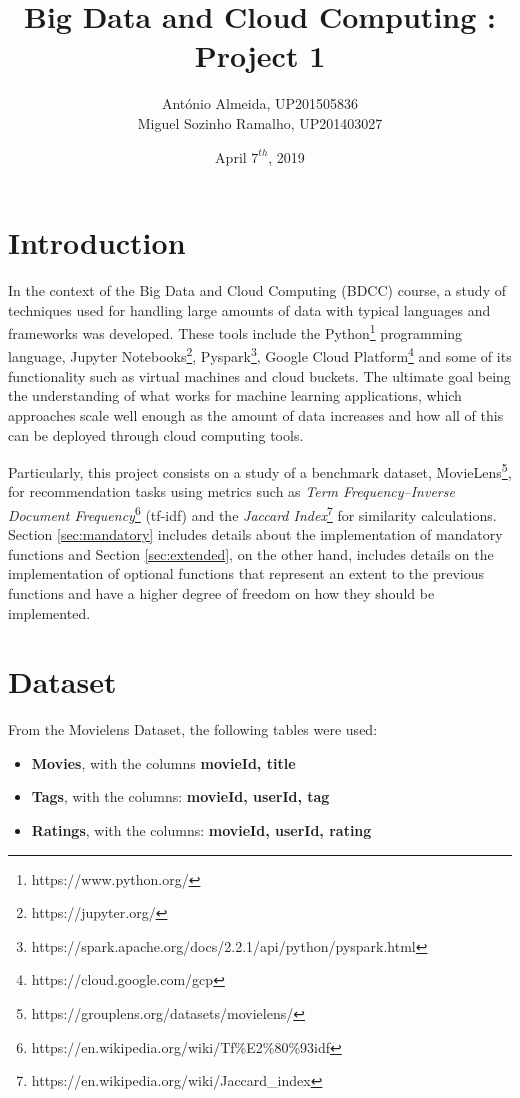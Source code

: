 \documentclass[10pt,twocolumn]{article}
\begin{document}
\author{António Almeida, UP201505836 \\Miguel Sozinho Ramalho, UP201403027}
\date{April $7^{th}$, 2019}
\title{Big Data and Cloud Computing : Project 1}
\twocolumn[
  \begin{@twocolumnfalse}
    \maketitle
    \tableofcontents
  \end{@twocolumnfalse}
]

\newpage
\pagebreak
\clearpage


\section{Introduction}
In the context of the Big Data and Cloud Computing (BDCC) course, a study of techniques used for handling large amounts of data with typical languages and frameworks was developed. These tools include the Python\footnote{https://www.python.org/} programming language, Jupyter Notebooks\footnote{https://jupyter.org/}, Pyspark\footnote{https://spark.apache.org/docs/2.2.1/api/python/pyspark.html}, Google Cloud Platform\footnote{https://cloud.google.com/gcp} and some of its functionality such as virtual machines and cloud buckets. The ultimate goal being the understanding of what works for machine learning applications, which approaches scale well enough as the amount of data increases and how all of this can be deployed through cloud computing tools. 

Particularly, this project consists on a study of a benchmark dataset, MovieLens\footnote{https://grouplens.org/datasets/movielens/}, for recommendation tasks using metrics such as \textit{Term Frequency–Inverse Document Frequency}\footnote{https://en.wikipedia.org/wiki/Tf\%E2\%80\%93idf} (tf-idf) and the \textit{Jaccard Index}\footnote{https://en.wikipedia.org/wiki/Jaccard_index} for similarity calculations. Section \ref{sec:mandatory} includes details about the implementation of mandatory functions and Section \ref{sec:extended}, on the other hand, includes details on the implementation of optional functions that represent an extent to the previous functions and have a higher degree of freedom on how they should be implemented.

\section{Dataset}
From the Movielens Dataset, the following tables were used:
\begin{itemize}
    \itemsep0em
    \item \textbf{Movies}, with the columns \textbf{movieId, title}
    \item \textbf{Tags}, with the columns: \textbf{movieId, userId, tag}
    \item \textbf{Ratings}, with the columns: \textbf{movieId, userId, rating}
\end{itemize}
\end{document}
